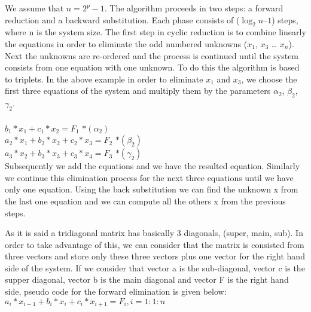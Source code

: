 We assume that $n= 2^p - 1$. 
The algorithm proceeds in two steps: a forward reduction and a backward substitution. Each phase consists of ($\log_2n – 1$) steps, where n is the system size. The first step in cyclic reduction is to combine linearly the equations in order to eliminate the odd numbered unknowns ($x_1$, $x_3$ … $x_n$). Next the unknowns are re-ordered and the process is continued until the system consists from one equation with one unknown. To do this the algorithm is based to triplets. In the above example in order to eliminate $x_1$ and $x_3$, we choose the first three equations of the system and multiply them by the parameters $\alpha_2$, $\beta_2$, $\gamma_2$. \\
\\
$b_1*x_1+c_1*x_2= F_1$                        \hspace*{5cm} $*(\alpha_2)$	\\
$a_2*x_1+ b_2*x_2+c_2*x_3= F_2$               \hspace*{3,3cm} $* (\beta_2)$  \\
\hspace*{2cm}$a_3*x_2+ b_3*x_3+c_3*x_4= F_3$  \hspace*{1,3cm} $*(\gamma_2)$     \\

Subsequently we add the equations and we have the resulted equation. Similarly we continue this elimination process for the next three equations until we have only one equation.
Using the back substitution we can find the unknown x from the last one equation and we can compute all the others x from the previous steps.

As it is said a tridiagonal matrix has basically 3 diagonals, (super, main, sub). In order to take advantage of this, we can consider that the matrix is consisted from three vectors and store only these three vectors plus one vector for the right hand side of the system.
If we consider that vector a is the sub-diagonal, vector c is the supper diagonal, vector b is the main diagonal and vector F is the right hand side, pseudo code for the forward elimination is given below: \\

$a_i*x_{i-1} + b_i*x_i+c_i*x_{i+1} = F_{i}  ,   i=1:1:n$





